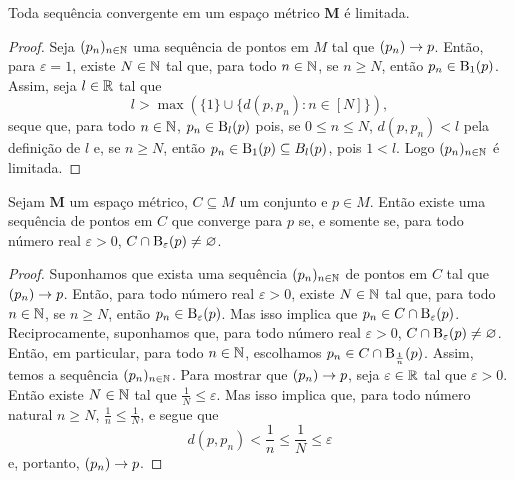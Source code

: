 \begin{prop}
Toda sequência convergente em um espaço métrico $\bm M$ é limitada.
\end{prop}
\begin{proof}
	Seja $(p_n)_{n \in \mathbb{N}}$ uma sequência de pontos em $M$ tal que $(p_n) \rightarrow p$. Então, para $\varepsilon = 1$, existe $N \in \mathbb{N}$ tal que, para todo $n \in \mathbb{N}$, se $n \geq N$, então $p_n \in \mathrm{B}_1(p)$. Assim, seja $l \in \mathbb{R}$ tal que
	\begin{equation*}
	l > \max(\{1\} \cup \{d(p,p_n) : n \in [N]\}),
	\end{equation*}
seque que, para todo $n \in \mathbb{N}$, $p_n \in \mathrm{B}_l(p)$ pois, se $0 \leq n \leq N$, $d(p,p_n) < l$ pela definição de $l$ e, se $n \geq N$, então $p_n \in \mathrm{B}_1(p) \subseteq B_l(p)$, pois $1 < l$. Logo $(p_n)_{n \in \mathbb{N}}$ é limitada.
\end{proof}

\begin{prop}
Sejam $\bm M$ um espaço métrico, $C \subseteq M$ um conjunto e $p \in M$. Então existe uma sequência de pontos em $C$ que converge para $p$ se, e somente se, para todo número real $\varepsilon > 0$, $C \cap \mathrm{B}_\varepsilon(p) \neq \varnothing$.
\end{prop}
\begin{proof}
	Suponhamos que exista uma sequência $(p_n)_{n \in \mathbb{N}}$ de pontos em $C$ tal que $(p_n) \rightarrow p$. Então, para todo número real $\varepsilon > 0$, existe $N \in \mathbb{N}$ tal que, para todo $n \in \mathbb{N}$, se $n \geq N$, então $p_n \in \mathrm{B}_\varepsilon(p)$. Mas isso implica que $p_n \in C \cap \mathrm{B}_\varepsilon(p)$. Reciprocamente, suponhamos que, para todo número real $\varepsilon > 0$, $C \cap \mathrm{B}_\varepsilon(p) \neq \varnothing$. Então, em particular, para todo $n \in \mathbb{N}$, escolhamos $p_n \in C \cap \mathrm{B}_{\frac{1}{n}}(p)$. Assim, temos a sequência $(p_n)_{n \in \mathbb{N}}$. Para mostrar que $(p_n) \rightarrow p$, seja $\varepsilon \in \mathbb{R}$ tal que $\varepsilon > 0$. Então existe $N \in \mathbb{N}$ tal que $\frac{1}{N} \leq \varepsilon$. Mas isso implica que, para todo número natural $n \geq N$, $\frac{1}{n} \leq \frac{1}{N}$, e segue que
	\begin{equation*}
	d(p,p_n) < \frac{1}{n} \leq \frac{1}{N} \leq \varepsilon
	\end{equation*}
e, portanto, $(p_n) \rightarrow p$.
\end{proof}

